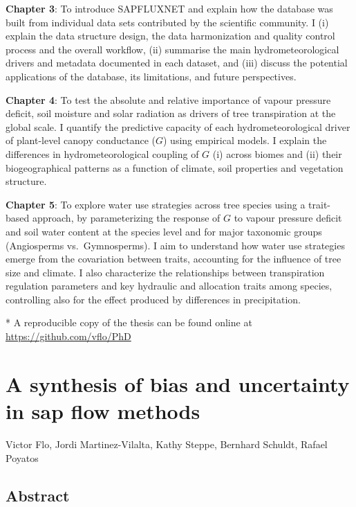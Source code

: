 \documentclass[11pt,twoside]{reedthesis}
\begin{document}
\textbf{Chapter 3}: To introduce SAPFLUXNET and explain how the database
was built from individual data sets contributed by the scientific
community. I (i) explain the data structure design, the data
harmonization and quality control process and the overall workflow, (ii)
summarise the main hydrometeorological drivers and metadata documented
in each dataset, and (iii) discuss the potential applications of the
database, its limitations, and future perspectives.\par

\textbf{Chapter 4}: To test the absolute and relative importance of
vapour pressure deficit, soil moisture and solar radiation as drivers of
tree transpiration at the global scale. I quantify the predictive
capacity of each hydrometeorological driver of plant-level canopy
conductance (\(G\)) using empirical models. I explain the differences in
hydrometeorological coupling of \(G\) (i) across biomes and (ii) their
biogeographical patterns as a function of climate, soil properties and
vegetation structure.\par

\textbf{Chapter 5}: To explore water use strategies across tree species
using a trait-based approach, by parameterizing the response of \(G\) to
vapour pressure deficit and soil water content at the species level and
for major taxonomic groups (Angiosperms vs.~Gymnosperms). I aim to
understand how water use strategies emerge from the covariation between
traits, accounting for the influence of tree size and climate. I also
characterize the relationships between transpiration regulation
parameters and key hydraulic and allocation traits among species,
controlling also for the effect produced by differences in
precipitation.\par

\vspace{4cm}

* A reproducible copy of the thesis can be found online at
\url{https://github.com/vflo/PhD}

\chapter[Bias and uncertainty in sap flow methods]{A synthesis of bias and uncertainty in sap flow methods}

\setlength{\parindent}{0pt} Victor Flo, Jordi Martinez-Vilalta, Kathy
Steppe, Bernhard Schuldt, Rafael Poyatos \newpage
\setlength{\parindent}{30pt}

\section*{Abstract}
\end{document}
